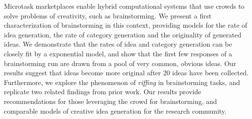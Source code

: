 Microtask marketplaces enable hybrid computational systems that use crowds to solve problems of creativity, such as brainstorming. We present a first characterization of brainstorming in this context, providing models for the rate of idea generation, the rate of category generation and the originality of generated ideas. We demonstrate that the rates of idea and category generation can be closely fit by a exponential model, and show that the first few responses of a brainstorming run are drawn from a pool of very common, obvious ideas. Our results suggest that ideas become more original after 20 ideas have been collected. Furthermore, we explore the phenomenon of \emph{riffing} in brainstorming tasks, and replicate two related findings from prior work. Our results provide recommendations for those leveraging the crowd for brainstorming, and comparable models of creative idea generation for the research community.


